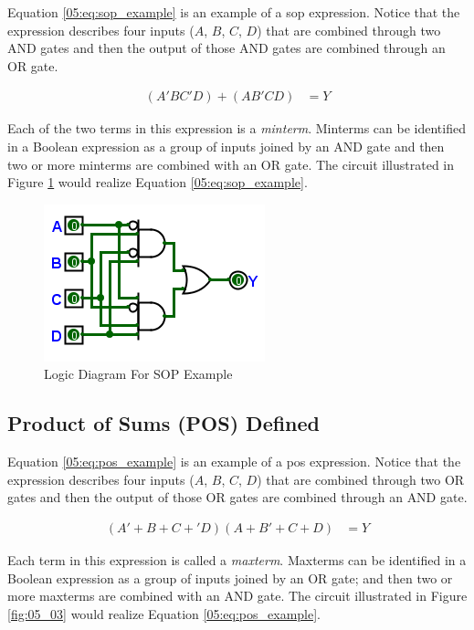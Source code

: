 Equation \ref{05:eq:sop_example} is an example of a \gls{sop} expression. Notice that the expression describes four inputs ($ A $, $ B $, $ C $, $ D $) that are combined through two \textsf{AND} gates and then the output of those \textsf{AND} gates are combined through an \textsf{OR} gate. 

\begin{align}
  \label{05:eq:sop_example}
  (A'BC'D)+(AB'CD) &= Y
\end{align}

Each of the two terms in this expression is a \emph{minterm}. Minterms can be identified in a Boolean expression as a group of inputs joined by an \textsf{AND} gate and then two or more minterms are combined with an \textsf{OR} gate. The circuit illustrated in Figure \ref{fig:05_02} would realize Equation \ref{05:eq:sop_example}.

\begin{figure}[H]
	\centering
	\includegraphics[width=\maxwidth{.95\linewidth}]{gfx/05_02}
	\caption{Logic Diagram For SOP Example}
	\label{fig:05_02}
\end{figure}

\subsection{Product of Sums (POS) Defined}
\label{05:subsec:product_of_sums_pos_defined}

Equation \ref{05:eq:pos_example} is an example of a \gls{pos} expression. Notice that the expression describes four inputs ($ A $, $ B $, $ C $, $ D $) that are combined through two \textsf{OR} gates and then the output of those \textsf{OR} gates are combined through an \textsf{AND} gate. 

\begin{align}
  \label{05:eq:pos_example}
  (A'+B+C+'D)(A+B'+C+D) &= Y
\end{align}

Each term in this expression is called a \emph{maxterm}. Maxterms can be identified in a Boolean expression as a group of inputs joined by an \textsf{OR} gate; and then two or more maxterms are combined with an \textsf{AND} gate. The circuit illustrated in Figure \ref{fig:05_03} would realize Equation \ref{05:eq:pos_example}. 

